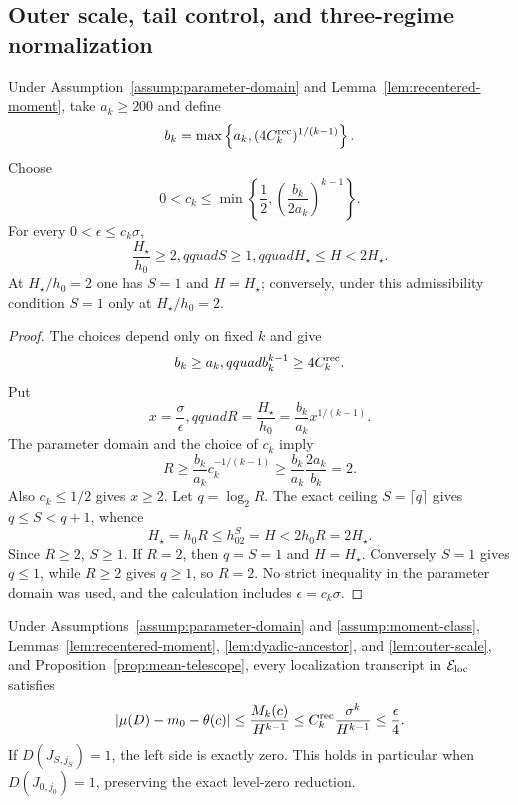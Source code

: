 \subsection{Outer scale, tail control, and three-regime normalization}

\begin{lemma}
\label{lem:outer-scale}
Under Assumption~\ref{assump:parameter-domain} and
Lemma~\ref{lem:recentered-moment}, take $a_k\geq200$ and define
\[
 b_k=\max\left\{a_k,(4C_k^{\rm rec})^{1/(k-1)}\right\}.
\]
Choose
\[
 0<c_k\leq\min\left\{\frac12,
   \left(\frac{b_k}{2a_k}\right)^{k-1}\right\}.
\]
For every $0<\epsilon\leq c_k\sigma$,
\[
 \frac{H_\star}{h_0}\geq2,qquad S\geq1,qquad
 H_\star\leq H<2H_\star.
\]
At $H_\star/h_0=2$ one has $S=1$ and $H=H_\star$; conversely, under
this admissibility condition $S=1$ only at $H_\star/h_0=2$.
\end{lemma}

\begin{proof}
The choices depend only on fixed $k$ and give
\[
 b_k\geq a_k,qquad b_k^{k-1}\geq4C_k^{\rm rec}.
\]
Put
\[
 x=\frac\sigma\epsilon,qquad
 R=\frac{H_\star}{h_0}=\frac{b_k}{a_k}x^{1/(k-1)}.
\]
The parameter domain and the choice of $c_k$ imply
\[
 R\geq\frac{b_k}{a_k}c_k^{-1/(k-1)}
 \geq\frac{b_k}{a_k}\frac{2a_k}{b_k}=2.
\]
Also $c_k\leq1/2$ gives $x\geq2$.  Let $q=\log_2R$.  The exact ceiling
$S=\lceil q\rceil$ gives $q\leq S<q+1$, whence
\[
 H_\star=h_0R\leq h_02^S=H<2h_0R=2H_\star.
\]
Since $R\geq2$, $S\geq1$.  If $R=2$, then $q=S=1$ and
$H=H_\star$.  Conversely $S=1$ gives $q\leq1$, while $R\geq2$ gives
$q\geq1$, so $R=2$.  No strict inequality in the parameter domain was used,
and the calculation includes $\epsilon=c_k\sigma$.
\end{proof}

\begin{proposition}\label{prop:tail-bound}
Under Assumptions~\ref{assump:parameter-domain} and
\ref{assump:moment-class}, Lemmas~\ref{lem:recentered-moment},
\ref{lem:dyadic-ancestor}, and \ref{lem:outer-scale}, and
Proposition~\ref{prop:mean-telescope}, every localization transcript in
$\mathcal E_{\rm loc}$ satisfies
\[
 |\mu(D)-m_0-\theta(c)|
 \leq\frac{M_k(c)}{H^{k-1}}
 \leq C_k^{\rm rec}\frac{\sigma^k}{H^{k-1}}
 \leq\frac\epsilon4.
\]
If $D(J_{S,j_S})=1$, the left side is exactly zero.  This holds in
particular when $D(J_{0,j_0})=1$, preserving the exact level-zero reduction.
\end{proposition}

